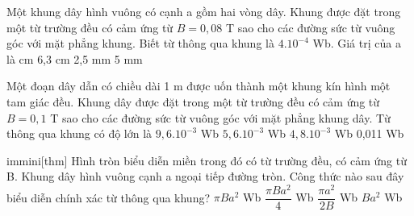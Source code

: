 \begin{vidu}%
Một khung dây hình vuông có cạnh a gồm hai vòng dây. Khung được đặt trong một từ trường đều có cảm ứng từ $B = 0,08$ T sao cho các đường sức từ vuông góc với mặt phẳng khung. Biết từ thông qua khung là $4. 10^{-4}$ Wb. Giá trị của a là
\choice
{ cm}
{6,3 cm}
{2,5 mm}
{5 mm}
\end{vidu}
\begin{vidu}%
Một đoạn dây dẫn có chiều dài 1 m được uốn thành một khung kín hình một tam giác đều. Khung dây được đặt trong một từ trường đều có cảm ứng từ $B = 0,1$ T sao cho các đường sức từ vuông góc với mặt phẳng khung dây. Từ thông qua khung có độ lớn là
\choice
{$9,6. 10^{-3}$ Wb}
{$5,6. 10^{-3}$ Wb}
{\True $4,8. 10^{-3}$ Wb}
{0,011 Wb}
\end{vidu}
\begin{vidu}%
immini[thm]{
Hình tròn biểu diễn miền trong đó có từ trường đều, có cảm ứng từ B. Khung dây hình vuông cạnh a ngoại tiếp đường tròn. Công thức nào sau đây biểu diễn chính xác từ thông qua khung?
\choice
{$\pi Ba^2$ Wb}
{\True $\dfrac{\pi Ba^2}{4}$ Wb}
{$\dfrac{\pi a^2}{2B}$ Wb}
{$Ba^2$ Wb}
}{
}
\end{vidu}
